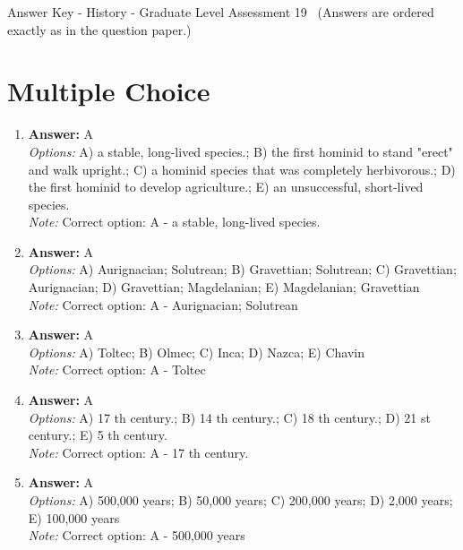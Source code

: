 \documentclass[12pt]{article}
\begin{document}
\begin{center}
Answer Key - History - Graduate Level Assessment 19 \
\small (Answers are ordered exactly as in the question paper.)
\end{center}

\section*{Multiple Choice}
\begin{enumerate}[label=\arabic*.]
\item \textbf{Answer:} A
\\ \textit{Options:} A) a stable, long-lived species.; B) the first hominid to stand "erect" and walk upright.; C) a hominid species that was completely herbivorous.; D) the first hominid to develop agriculture.; E) an unsuccessful, short-lived species.
\\ \textit{Note:} Correct option: A - a stable, long-lived species.
\item \textbf{Answer:} A
\\ \textit{Options:} A) Aurignacian; Solutrean; B) Gravettian; Solutrean; C) Gravettian; Aurignacian; D) Gravettian; Magdelanian; E) Magdelanian; Gravettian
\\ \textit{Note:} Correct option: A - Aurignacian; Solutrean
\item \textbf{Answer:} A
\\ \textit{Options:} A) Toltec; B) Olmec; C) Inca; D) Nazca; E) Chavin
\\ \textit{Note:} Correct option: A - Toltec
\item \textbf{Answer:} A
\\ \textit{Options:} A) 17 th century.; B) 14 th century.; C) 18 th century.; D) 21 st century.; E) 5 th century.
\\ \textit{Note:} Correct option: A - 17 th century.
\item \textbf{Answer:} A
\\ \textit{Options:} A) 500,000 years; B) 50,000 years; C) 200,000 years; D) 2,000 years; E) 100,000 years
\\ \textit{Note:} Correct option: A - 500,000 years
\end{enumerate}
\end{document}
